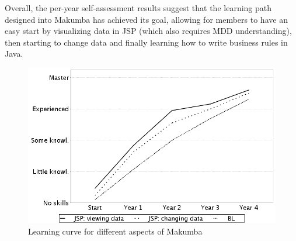 \documentclass{llncs}
\begin{document}
Overall, the per-year self-assessment results suggest that the learning path designed into Makumba has achieved its goal, allowing for members to have an easy start by visualizing data in JSP (which also requires MDD understanding), then starting to change data and finally learning how to write business rules in Java.

\begin{figure}[t]
  \centering
   \includegraphics[width=0.6\columnwidth]{figures/learning-technologies}
  \caption{Learning curve for different aspects of Makumba}
  \label{fig:learning-technologies}
\end{figure} 

\end{document}
